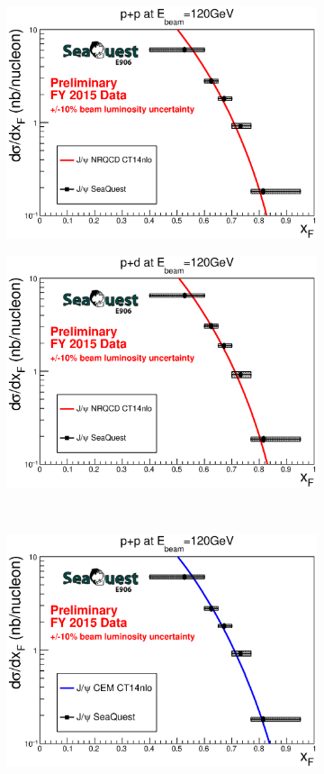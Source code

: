 \documentclass[10pt, a4paper,final]{article}
\begin{document}
\begin{figure}[htbp!]
	\centering
	\begin{subfigure}{0.45\linewidth}
		\includegraphics[width=0.9\linewidth]{jpsi_xF_LH2}
	\end{subfigure}
	\begin{subfigure}{0.45\linewidth}
		\includegraphics[width=0.9\linewidth]{jpsi_xF_LD2}
	\end{subfigure}\\
	\begin{subfigure}{0.45\linewidth}
		\includegraphics[width=0.9\linewidth]{jpsi_xF_LH2_CEM}

\end{subfigure}
\end{figure}
\end{document}
